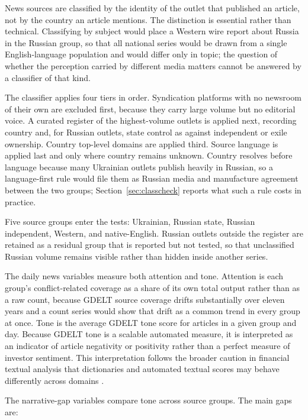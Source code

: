 \documentclass[12pt,a4paper]{article}
\begin{document}
News sources are classified by the identity of the outlet that published an article, not by the country an article mentions. The distinction is essential rather than technical. Classifying by subject would place a Western wire report about Russia in the Russian group, so that all national series would be drawn from a single English-language population and would differ only in topic; the question of whether the perception carried by different media matters cannot be answered by a classifier of that kind.

The classifier applies four tiers in order. Syndication platforms with no newsroom of their own are excluded first, because they carry large volume but no editorial voice. A curated register of the highest-volume outlets is applied next, recording country and, for Russian outlets, state control as against independent or exile ownership. Country top-level domains are applied third. Source language is applied last and only where country remains unknown. Country resolves before language because many Ukrainian outlets publish heavily in Russian, so a language-first rule would file them as Russian media and manufacture agreement between the two groups; Section~\ref{sec:classcheck} reports what such a rule costs in practice.

Five source groups enter the tests: Ukrainian, Russian state, Russian independent, Western, and native-English. Russian outlets outside the register are retained as a residual group that is reported but not tested, so that unclassified Russian volume remains visible rather than hidden inside another series.

The daily news variables measure both attention and tone. Attention is each group's conflict-related coverage as a share of its own total output rather than as a raw count, because GDELT source coverage drifts substantially over eleven years and a count series would show that drift as a common trend in every group at once. Tone is the average GDELT tone score for articles in a given group and day. Because GDELT tone is a scalable automated measure, it is interpreted as an indicator of article negativity or positivity rather than a perfect measure of investor sentiment. This interpretation follows the broader caution in financial textual analysis that dictionaries and automated textual scores may behave differently across domains \citep{loughran2011textual}.

The narrative-gap variables compare tone across source groups. The main gaps are:
\end{document}
